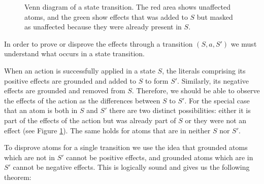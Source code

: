 \documentclass[../Master.tex]{subfiles}
\begin{document}
\begin{figure}
	\def\firstcircle{(0,0) circle (1.5cm)}
	\def\secondcircle{(0:2cm) circle (1.5cm)}
	\def\thirdcircle{(0:3.8cm) circle (2.9cm)}
	\centering
    \caption{\label{fig:nca:venn-of-effects} Venn diagram of a state transition. The red area shows unaffected atoms, and the green show effects that was added to $S$ but masked as unaffected because they were already present in $S$.}
\end{figure}



In order to prove or disprove the effects through a transition $(S,a,S')$ we must understand what occurs in a state transition.

When an action is successfully applied in a state $S$, the literals comprising its positive effects are grounded and added to $S$ to form $S'$. Similarly, its negative effects are grounded and removed from $S$. Therefore, we should be able to observe the effects of the action as the differences between $S$ to $S'$. For the special case that an atom is both in $S$ and $S'$ there are two distinct possibilities: either it is part of the effects of the action but was already part of $S$ or they were not an effect (see Figure \ref{fig:nca:venn-of-effects}). The same holds for atoms that are in neither $S$ nor $S'$.

To disprove atoms for a single transition we use the idea that grounded atoms which are not in $S'$ cannot be positive effects, and grounded atoms which are in $S'$ cannot be negative effects. 
This is logically sound and gives us the following theorem:
\end{document}
